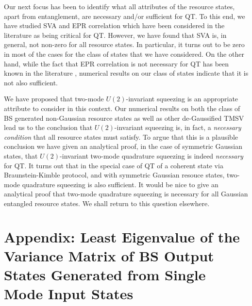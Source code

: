\documentclass[letter,scriptaddress,twocolumn, prl,showkeys]{revtex4}
\begin{document}
Our next focus has been to identify what all attributes of the resource states, apart from entanglement, are necessary and/or sufficient for QT.
To this end, we have studied SVA and EPR correlation which have been considered in the literature as being critical for QT.
However, we have found that SVA is, in general, not non-zero for all resource states.
In particular, it turns out to be zero in most of the cases for the class of states that we have considered.
On the other hand, while the fact that EPR correlation is not necessary for QT has been known in the literature \cite{tp_wang,tp_lee}, numerical results on our class of states indicate that it is not also sufficient.

We have proposed that two-mode $U(2)$-invariant squeezing \cite{qs_simon} is an appropriate attribute to consider in this context.
Our numerical results on both the class of BS generated non-Gaussian resource states as well as other de-Gaussified TMSV lead us to the conclusion that $U(2)$-invariant squeezing is, in fact, a \emph{necessary condition} that all resource states must satisfy.
To argue that this is a plausible conclusion we have given an analytical proof, in the case of symmetric Gaussian states, that $U(2)$-invariant two-mode quadrature squeezing is indeed \emph{necessary} for QT.
It turns out that in the special case of QT of a coherent state via Braunstein-Kimble protocol, and with symmetric Gaussian resouce states, two-mode quadrature squeezing is also sufficient. 
It would be nice to give an analytical proof that two-mode quadrature squeezing is necessary for all Gaussian entangled resource states.
We shall return to this question elsewhere.

\section*{Appendix: Least Eigenvalue of the Variance Matrix of BS Output States Generated from Single Mode Input States}
\end{document}
